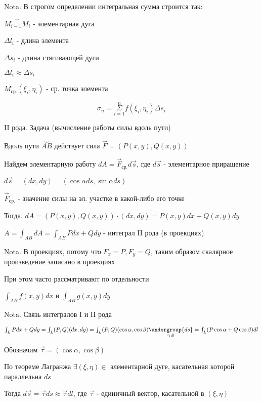\documentclass[12pt]{article}
\begin{document}
    Nota. В строгом определении интегральная сумма строится так:

    $\overset{\smile}{M_{i-1}M_i}$ - элементарная дуга

    $\Delta l_i$ - длина элемента

    $\Delta s_i$ - длина стягивающей дуги

    $\Delta l_i \approx \Delta s_i$

    $M_{\text{ср.}}(\xi_i, \eta_i)$ - ср. точка элемента

    \[\sigma_n = \overset{n}{\underset{i = 1}{\Sigma}} f(\xi_i, \eta_i) \Delta s_i\]

    \vspace{10mm}

    II рода. Задача (вычисление работы силы вдоль пути)

    Вдоль пути $\overset{\smile}{AB}$ действует сила $\overrightarrow{F} = (P(x, y), Q(x, y))$

    Найдем элементарную работу $dA = \overrightarrow{F}_{\text{ср.}} d\overrightarrow{s}$, где $d\overrightarrow{s}$ - элементарное приращение

    $d\overrightarrow{s} = (dx, dy) = (\cos\alpha ds, \sin\alpha ds)$

    $\overrightarrow{F}_{\text{ср.}}$ - значение силы на эл. участке в какой-либо его точке

    Тогда. $dA = (P(x, y), Q(x, y)) \cdot (dx, dy) = P(x, y)dx + Q(x, y)dy$

    $A = \int_{AB} dA = \int_{AB} Pdx + Qdy$ - интеграл II рода (в проекциях)

    Nota. В проекциях, потому что $F_x = P, F_y = Q$, таким образом скалярное произведение записано в проекциях

    При этом часто рассматривают по отдельности

    $\int_{AB} f(x, y) dx$ и $\int_{AB} g(x, y) dy$

    Nota. Связь интегралов I и II рода

    $\int_L Pdx + Qdy = \int_L (P, Q)(dx, dy) = \int_L (P, Q) (\cos\alpha, \cos\beta) \underset{\approx dl}{\undergroup{ds}} =
    \int_L (P\cos\alpha + Q\cos\beta)dl$

    Обозначим $\overrightarrow{\tau} = (\cos\alpha, \cos\beta)$

    По теореме Лагранжа $\exists (\xi, \eta) \in$ элементарной дуге, касательная которой параллельна $ds$

    Тогда $d\overrightarrow{s} = \overrightarrow{\tau}ds \approx \overrightarrow{\tau}dl$, где $\overrightarrow{\tau}$ - единичный вектор, касательной в $(\xi, \eta)$
\end{document}
